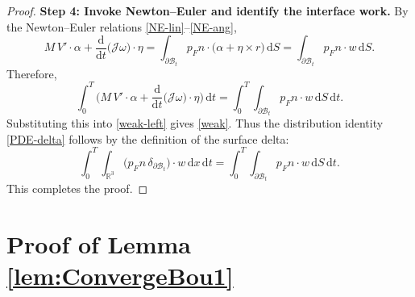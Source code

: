 \documentclass[11pt,twoside,reqno]{amsart}
\numberwithin{equation}{section}
\numberwithin{figure}{section}
\begin{document}
\begin{proof}
\noindent\textbf{Step 4: Invoke Newton--Euler and identify the interface work.}
By the Newton--Euler relations \eqref{NE-lin}--\eqref{NE-ang},
\[
M\,{V'}\cdot \alpha
+\frac{\mathrm{d}}{\mathrm{d}t}\big(\mathcal J\omega\big)\cdot\eta
=\int_{\partial\mathcal{B}_t}p_Fn\cdot
\big(\alpha+\eta\times r\big)\,\mathrm{d}S=\int_{\partial\mathcal{B}_t} p_Fn\cdot w\,\mathrm{d}S.
\]
Therefore,
\[
\int_0^T \Big(M\,{V'}\cdot \alpha
+\frac{\mathrm{d}}{\mathrm{d}t}\big(\mathcal J\omega\big)\cdot\eta\Big)\,\mathrm{d}t
=\int_0^T\!\!\int_{\partial\mathcal{B}_t} p_Fn\cdot w\,\mathrm{d}S\,\mathrm{d}t.
\]
Substituting this into \eqref{weak-left} gives \eqref{weak}. Thus the distribution
identity \eqref{PDE-delta} follows by the definition of the surface delta:
\[
\int_0^T\!\!\int_{\mathbb R^3}\big(p_Fn\,\delta_{\partial\mathcal{B}_t}\big)\cdot w\,\mathrm{d}x\,\mathrm{d}t
=\int_0^T\!\!\int_{\partial\mathcal{B}_t} p_Fn\cdot w\,\mathrm{d}S\,\mathrm{d}t.
\]
This completes the proof.
\end{proof}

\section{Proof of Lemma \ref{lem:ConvergeBou1}}
\label{app:proof-lem-ConvergeBou1}
\end{document}

